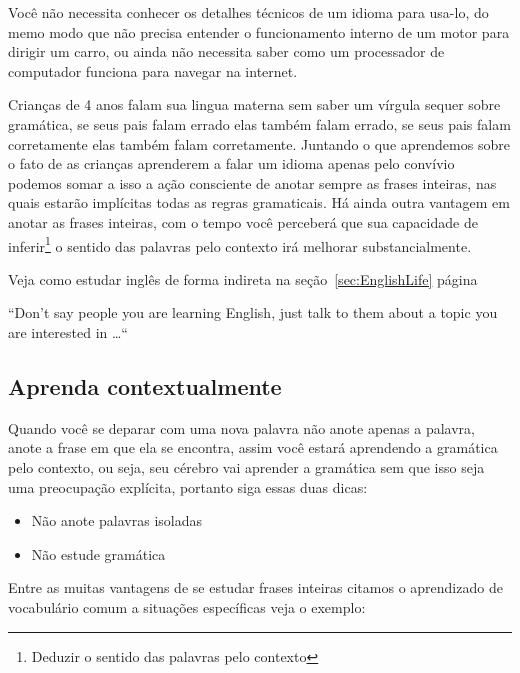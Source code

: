 Você não necessita conhecer os detalhes técnicos de um idioma para usa-lo,
do memo modo que não precisa entender o funcionamento interno de um motor para dirigir
um carro, ou ainda não necessita saber como um processador de computador funciona
para navegar na internet.

Crianças de 4 anos falam sua lingua materna sem saber um vírgula sequer sobre
gramática, se seus pais falam errado elas também falam errado, se seus pais
falam corretamente elas também falam corretamente. Juntando o que aprendemos
sobre o fato de as crianças aprenderem a falar um idioma apenas pelo convívio
podemos somar a isso a ação consciente de anotar sempre as frases inteiras, nas
quais estarão implícitas todas as regras gramaticais. Há ainda outra vantagem
em anotar as frases inteiras, com o tempo você perceberá que sua capacidade de
inferir\footnote{Deduzir o sentido das palavras pelo contexto} o sentido
das palavras pelo contexto irá melhorar substancialmente.

\vspace{0.3\baselineskip}
\noindent
{\footnotesize {}  Veja como estudar inglês de forma indireta na seção~\ref{sec:EnglishLife}
página~\pageref{sec:EnglishLife}}

\vspace{0.3\baselineskip}
\noindent
{\footnotesize {}  ``Don't say people you are learning English, just
talk to them about a topic you are interested in \dots ``}

\subsection{Aprenda contextualmente}\label{sub:aprenda-contextualmente}

Quando você se deparar com uma nova palavra não anote apenas a palavra, anote
a frase em que ela se encontra, assim você estará aprendendo a gramática pelo
contexto, ou seja, seu cérebro vai aprender a gramática sem que isso seja uma
preocupação explícita, portanto siga essas duas dicas:

\begin{itemize}
     \item{Não anote palavras isoladas}
     \item{Não estude gramática}
\end{itemize}

\noindent
Entre as muitas vantagens de se estudar frases inteiras citamos o aprendizado
de vocabulário comum a situações específicas veja o exemplo:

